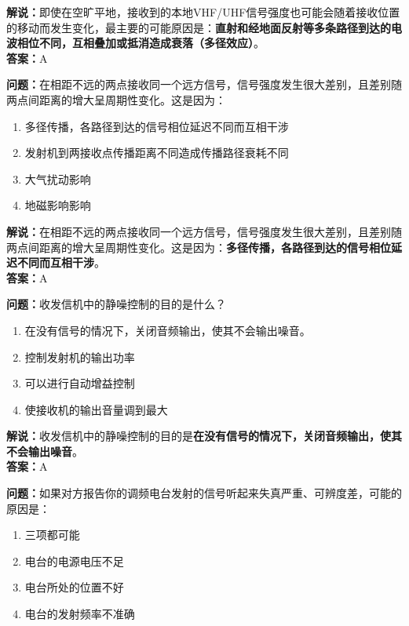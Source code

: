 \textbf{解说：}即使在空旷平地，接收到的本地VHF/UHF信号强度也可能会随着接收位置的移动而发生变化，最主要的可能原因是：\textbf{直射和经地面反射等多条路径到达的电波相位不同，互相叠加或抵消造成衰落（多径效应）}。\\\textbf{答案：}A%


\textbf{问题：}在相距不远的两点接收同一个远方信号，信号强度发生很大差别，且差别随两点间距离的增大呈周期性变化。这是因为：

\begin{enumerate}[label=\Alph*), leftmargin=1cm]
	\item 多径传播，各路径到达的信号相位延迟不同而互相干涉
	\item 发射机到两接收点传播距离不同造成传播路径衰耗不同
	\item 大气扰动影响
	\item 地磁影响影响
\end{enumerate}

\textbf{解说：}在相距不远的两点接收同一个远方信号，信号强度发生很大差别，且差别随两点间距离的增大呈周期性变化。这是因为：\textbf{多径传播，各路径到达的信号相位延迟不同而互相干涉}。\\\textbf{答案：}A%


\textbf{问题：}收发信机中的静噪控制的目的是什么？

\begin{enumerate}[label=\Alph*), leftmargin=1cm]
	\item 在没有信号的情况下，关闭音频输出，使其不会输出噪音。
	\item 控制发射机的输出功率
	\item 可以进行自动增益控制
	\item 使接收机的输出音量调到最大
\end{enumerate}

\textbf{解说：}收发信机中的静噪控制的目的是\textbf{在没有信号的情况下，关闭音频输出，使其不会输出噪音}。\\\textbf{答案：}A%

\textbf{问题：}如果对方报告你的调频电台发射的信号听起来失真严重、可辨度差，可能的原因是：

\begin{enumerate}[label=\Alph*), leftmargin=1cm]
	\item 三项都可能
	\item 电台的电源电压不足
	\item 电台所处的位置不好
	\item 电台的发射频率不准确
\end{enumerate}

